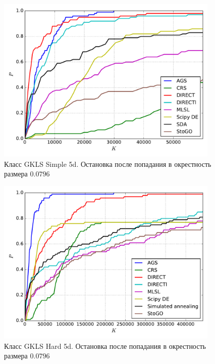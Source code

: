\documentclass[a4paper]{article}
\begin{document}
\begin{figure}[H]
  \center
  \includegraphics[width=0.95\textwidth]{../experiments_serg_scheme/gklss5d/cmc.pdf}
  \caption{Класс GKLS Simple 5d. Остановка после попадания в окрестность размера $0.0796$}
  \label{fig:}
\end{figure}


\begin{figure}[H]
  \center
  \includegraphics[width=0.95\textwidth]{../experiments_serg_scheme/gklsh5d/cmc.pdf}
  \caption{Класс GKLS Hard 5d. Остановка после попадания в окрестность размера $0.0796$}
  \label{fig:}
\end{figure}

\end{document}

